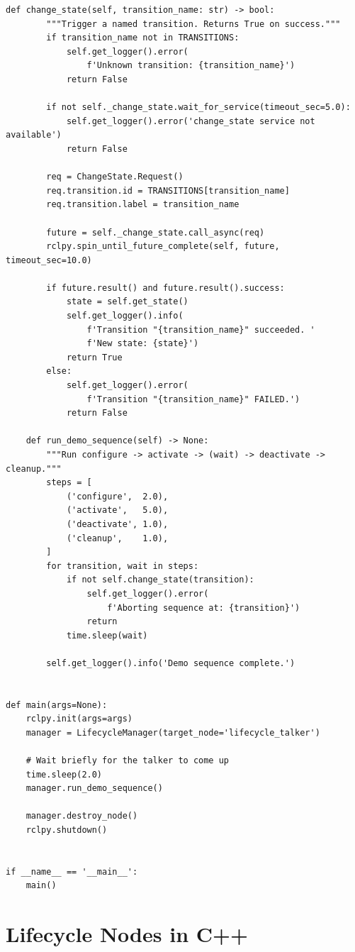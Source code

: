 \documentclass[11pt,a4paper]{csarticle}
\begin{document}
\begin{lstlisting}[style=python,caption={lifecycle\_manager.py}]
    def change_state(self, transition_name: str) -> bool:
        """Trigger a named transition. Returns True on success."""
        if transition_name not in TRANSITIONS:
            self.get_logger().error(
                f'Unknown transition: {transition_name}')
            return False

        if not self._change_state.wait_for_service(timeout_sec=5.0):
            self.get_logger().error('change_state service not available')
            return False

        req = ChangeState.Request()
        req.transition.id = TRANSITIONS[transition_name]
        req.transition.label = transition_name

        future = self._change_state.call_async(req)
        rclpy.spin_until_future_complete(self, future, timeout_sec=10.0)

        if future.result() and future.result().success:
            state = self.get_state()
            self.get_logger().info(
                f'Transition "{transition_name}" succeeded. '
                f'New state: {state}')
            return True
        else:
            self.get_logger().error(
                f'Transition "{transition_name}" FAILED.')
            return False

    def run_demo_sequence(self) -> None:
        """Run configure -> activate -> (wait) -> deactivate -> cleanup."""
        steps = [
            ('configure',  2.0),
            ('activate',   5.0),
            ('deactivate', 1.0),
            ('cleanup',    1.0),
        ]
        for transition, wait in steps:
            if not self.change_state(transition):
                self.get_logger().error(
                    f'Aborting sequence at: {transition}')
                return
            time.sleep(wait)

        self.get_logger().info('Demo sequence complete.')


def main(args=None):
    rclpy.init(args=args)
    manager = LifecycleManager(target_node='lifecycle_talker')

    # Wait briefly for the talker to come up
    time.sleep(2.0)
    manager.run_demo_sequence()

    manager.destroy_node()
    rclpy.shutdown()


if __name__ == '__main__':
    main()
\end{lstlisting}

\section{Lifecycle Nodes in C++}
\label{sec:cpp}
\end{document}
